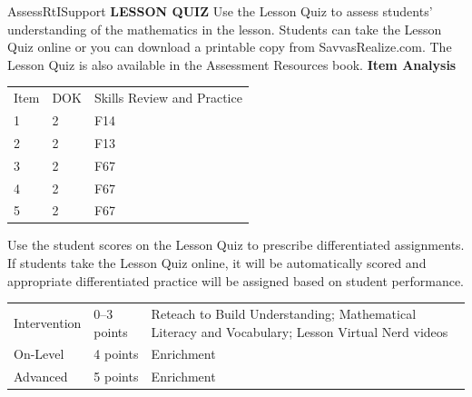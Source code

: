 \documentclass{article}
\newenvironment{te-addendum}[2]{}{}     %
\begin{document}
\begin{te-addendum}{Assess}{RtISupport}
\textbf{LESSON QUIZ}
Use the Lesson Quiz to assess students' understanding of the mathematics in the lesson.
Students can take the Lesson Quiz online or you can download a printable copy from SavvasRealize.com. The Lesson Quiz is also available in the Assessment Resources book.
\textbf{Item Analysis}
\begin{tabular}{lll}
Item & DOK & Skills Review and Practice \\
1 & 2 & F14 \\
2 & 2 & F13 \\
3 & 2 & F67 \\
4 & 2 & F67 \\
5 & 2 & F67 \\
\end{tabular}
Use the student scores on the Lesson Quiz to prescribe differentiated assignments.
If students take the Lesson Quiz online, it will be automatically scored and appropriate differentiated practice will be assigned based on student performance.
\begin{tabular}{lll}
Intervention & 0--3 points & Reteach to Build Understanding; Mathematical Literacy and Vocabulary; Lesson Virtual Nerd videos \\
On-Level & 4 points & Enrichment \\
Advanced & 5 points & Enrichment \\
\end{tabular}
\end{te-addendum}
\end{document}
